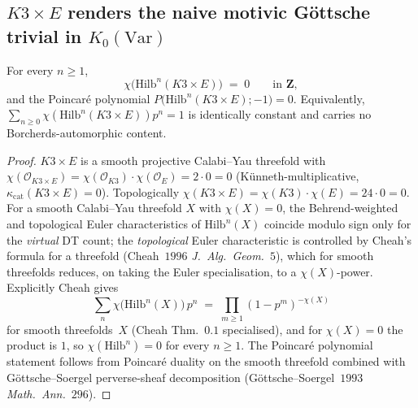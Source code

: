 \subsection*{\texorpdfstring{$K3 \times E$}{K3 x E} renders the naive motivic Göttsche
trivial in \texorpdfstring{$K_0(\mathrm{Var})$}{K-0(Var)}}

\begin{proposition}
\label{prop:k3qt-motivic-trivial-k3e}
For every $n \geq 1$,
\begin{equation}
 \chi\!\bigl(\mathrm{Hilb}^n(K3 \times E)\bigr) \;=\; 0
 \qquad \text{in } \mathbf Z,
\end{equation}
and the Poincaré polynomial
$P\bigl(\mathrm{Hilb}^n(K3 \times E); -1\bigr) = 0$.
Equivalently,
$\sum_{n \geq 0} \chi(\mathrm{Hilb}^n(K3 \times E)) p^n = 1$ is
identically constant and carries no Borcherds-automorphic content.
\end{proposition}

\begin{proof}
$K3 \times E$ is a smooth projective Calabi--Yau threefold with
$\chi(\mathcal O_{K3 \times E}) = \chi(\mathcal O_{K3}) \cdot
\chi(\mathcal O_E) = 2 \cdot 0 = 0$ (Künneth-multiplicative,
$\kappa_{\mathrm{cat}}(K3 \times E) = 0$).
Topologically $\chi(K3 \times E) = \chi(K3) \cdot \chi(E) =
24 \cdot 0 = 0$. For a smooth Calabi--Yau threefold $X$ with
$\chi(X) = 0$, the Behrend-weighted and topological Euler
characteristics of $\mathrm{Hilb}^n(X)$ coincide modulo sign
only for the \emph{virtual} DT count; the \emph{topological}
Euler characteristic is controlled by Cheah's formula for a
threefold (Cheah~$1996$ \emph{J.\ Alg.\ Geom.}~$5$), which for
smooth threefolds reduces, on taking the Euler specialisation,
to a $\chi(X)$-power. Explicitly Cheah gives
\begin{equation}
 \sum_{n} \chi\!\bigl(\mathrm{Hilb}^n(X)\bigr)\, p^n
 \;=\;
 \prod_{m \geq 1} (1 - p^m)^{-\chi(X)}
\end{equation}
for smooth threefolds~$X$ (Cheah Thm.~$0.1$ specialised), and
for $\chi(X) = 0$ the product is $1$, so $\chi(\mathrm{Hilb}^n) = 0$
for every $n \geq 1$. The Poincaré polynomial statement follows
from Poincaré duality on the smooth threefold combined with
Göttsche--Soergel perverse-sheaf decomposition
(Göttsche--Soergel~$1993$ \emph{Math.~Ann.}~$296$).
\end{proof}

